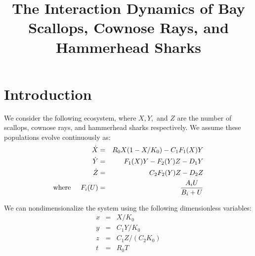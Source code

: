\documentclass[%
        final,
        notitlepage,
        narroweqnarray,
        inline,
        ]{ieee}
\begin{document}
\title[18.353 Final Project]{The Interaction Dynamics of Bay Scallops, Cownose Rays, and Hammerhead Sharks}

\author[John Wang]{}




\maketitle               



\section{Introduction}

We consider the following ecosystem, where $X,Y,$ and $Z$ are the number of scallops, cownose rays, and hammerhead sharks respectively. We assume these populations evolve continuously as:
\begin{eqnarray}
\dot{X} &=& R_0 X(1 - X/K_0) - C_1 F_1(X) Y \nonumber \\
\dot{Y} &=& F_1 (X) Y - F_2 (Y) Z - D_1 Y \\
\dot{Z} &=& C_2 F_2(Y) Z - D_2 Z \nonumber \\
\mathrm{where} \hspace{0.5cm} F_i(U) &=& \frac{A_i U}{B_i + U} \nonumber
\end{eqnarray}

We can nondimensionalize the system using the following dimensionless variables:
\begin{eqnarray}
x &=& X/K_0 \nonumber \\
y &=& C_1 Y/ K_0 \nonumber \\
z &=& C_1 Z / (C_2 K_0) \\
t &=& R_0 T \nonumber
\end{eqnarray}
\end{document}

